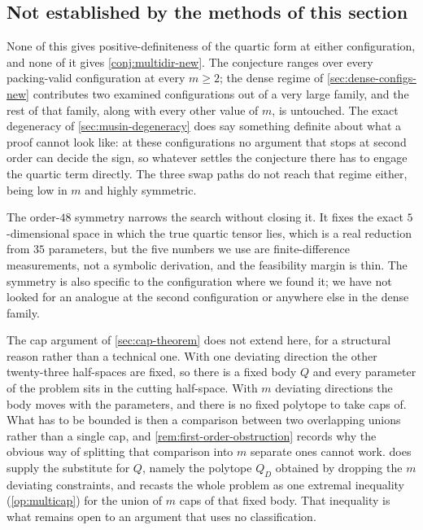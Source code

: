 \documentclass[11pt,reqno]{amsart}
\renewcommand{\_}{\origunderscore\allowbreak}
\numberwithin{equation}{section}
\theoremstyle{plain}
\theoremstyle{definition}
\theoremstyle{remark}
\begin{document}
\subsection{Not established by the methods of this section}

None of this gives positive-definiteness of the quartic form at either
configuration, and none of it gives \cref{conj:multidir-new}. The
conjecture ranges over every packing-valid configuration at every
$m\ge2$; the dense regime of \cref{sec:dense-configs-new} contributes
two examined configurations out of a very large family, and the rest of
that family, along with every other value of $m$, is untouched. The
exact degeneracy of \cref{sec:musin-degeneracy} does say something
definite about what a proof cannot look like: at these configurations no
argument that stops at second order can decide the sign, so whatever
settles the conjecture there has to engage the quartic term directly.
The three swap paths do not reach that regime either, being low in $m$
and highly symmetric.

The order-$48$ symmetry narrows the search without closing it. It fixes
the exact $5$-dimensional space in which the true quartic tensor lies,
which is a real reduction from $35$ parameters, but the five numbers we
use are finite-difference measurements, not a symbolic derivation, and
the feasibility margin is thin. The symmetry is also specific to the
configuration where we found it; we have not looked for an analogue at
the second configuration or anywhere else in the dense family.

The cap argument of \cref{sec:cap-theorem} does not extend here, for a
structural reason rather than a technical one. With one deviating
direction the other twenty-three half-spaces are fixed, so there is a
fixed body $Q$ and every parameter of the problem sits in the cutting
half-space. With $m$ deviating directions the body moves with the
parameters, and there is no fixed polytope to take caps of. What has to
be bounded is then a comparison between two overlapping unions rather
than a single cap, and \cref{rem:first-order-obstruction} records why
the obvious way of splitting that comparison into $m$ separate ones
cannot work.  does supply the substitute for $Q$, namely the
polytope $Q_D$ obtained by dropping the $m$ deviating constraints, and
recasts the whole problem as one extremal inequality
(\cref{op:multicap}) for the union of $m$ caps of that fixed body. That
inequality is what remains open to an argument that uses no
classification.
\end{document}
